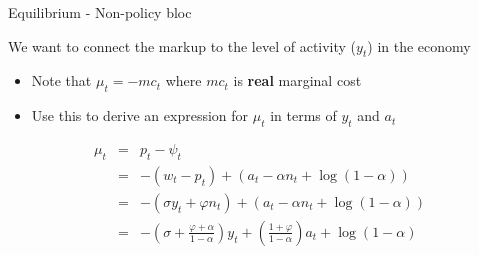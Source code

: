 \documentclass{beamer}
\begin{document}
%
%	
%
%
%
%


	
\begin{frame}{Equilibrium - Non-policy bloc}

We want to connect the markup to the level of activity ($y_{t}$) in the economy
\begin{itemize}
\item	Note that $\mu_{t}=-mc_{t}$ where $mc_{t}$ is \textbf{real} marginal cost
\item	Use this to derive an expression for $\mu_{t}$ in terms of $y_{t}$ and $a_{t}$
\end{itemize}
\begin{eqnarray*}
\mu_{t} &=& p_{t} - \psi_{t}	\\
		&=& -(w_{t} - p_{t}) + (a_{t} - \alpha n_{t} + \log{(1-\alpha)}) \\
		&=& -(\sigma y_{t} + \varphi n_{t}) + (a_{t} - \alpha n_{t} + \log{(1-\alpha)}) \\
		&=& - \left( \sigma + \frac{\varphi + \alpha}{1-\alpha} \right)y_{t} + \left( \frac{1+\varphi}{1-\alpha} \right) a_{t} + \log{(1-\alpha)}
\end{eqnarray*}


\end{frame}
\end{document}
